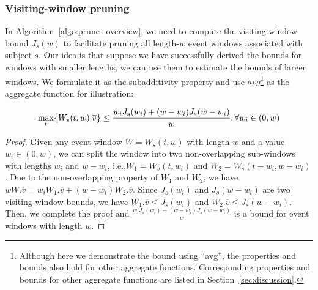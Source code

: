 \subsubsection{Visiting-window pruning}  
\label{sec:visiting-window-bound}
In Algorithm~\ref{algo:prune_overview}, we need to compute the visiting-window bound $J_s(w)$ to facilitate pruning all length-$w$ event windows associated with subject $s$. Our idea is that suppose we have successfully derived the bounds for windows with smaller lengths, we can use them to estimate the bounds of larger windows. We formulate it as the subadditivity property and use $avg$\footnote{Although here we demonstrate the bound
using ``avg'', the properties and bounds also hold for other aggregate functions. Corresponding properties and bounds for other aggregate functions are listed in Section~\ref{sec:discussion}.
} as the aggregate function for illustration: 

\begin{theorem}
\label{lem:subaverage}
\begin{equation}
\small
\label{eq:subadditivity}
	\max_t\{W_s(t,w).\overline{v}\} \leq \frac{w_i J_s(w_i) + (w-w_i) J_s(w-w_i)}{w}, \forall w_i \in (0,w)
\end{equation}
\end{theorem}
\begin{proof}
Given any event window $W=W_s(t,w)$ with length $w$ and a value $w_i \in (0,w)$, we can split the window into two non-overlapping sub-windows with lengths $w_i$ and $w-w_i$, i.e.,$W_1 = W_s(t,w_i)$ and $W_2 = W_s(t-w_i, w-w_i)$. Due to the non-overlapping property of $W_1$ and $W_2$, we have $wW.\overline{v} = w_iW_1.\overline{v} + (w-w_i)W_2.\overline{v}$.  Since $J_s(w_i)$ and $J_s(w-w_i)$ are two visiting-window bounds, we have $W_1.\overline{v}\leq J_s(w_i)$ and $W_2.\overline{v}\leq J_s(w-w_i)$. %
Then, we complete the proof and $\frac{w_i J_s(w_i) + (w-w_i) J_s(w-w_i)}{w}$ is a bound for event windows with length $w$.
\end{proof}





